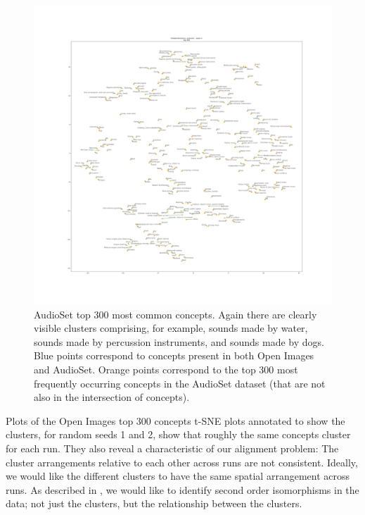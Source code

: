 \begin{figure}[H]
    \centering
    \includegraphics[width=1.0\textwidth]{images/method/probabilistic_independent/top300_tsne_audioset__ProbabilisticGlove_1.png}
    \caption{
        AudioSet top 300 most common concepts. Again there are clearly visible clusters comprising, for example, sounds made by water, sounds made by percussion instruments, and sounds made by dogs. Blue points correspond to concepts present in both Open Images and AudioSet. Orange points correspond to the top 300 most frequently occurring concepts in the AudioSet dataset (that are not also in the intersection of concepts).
    }
\end{figure}

Plots of the Open Images top 300 concepts t-SNE plots annotated to show the clusters, for random seeds 1 and 2, show that roughly the same concepts cluster for each run. They also reveal a characteristic of our alignment problem: The cluster arrangements relative to each other across runs are not consistent. Ideally, we would like the different clusters to have the same spatial arrangement across runs. As described in \cite{SHEPARD19701}, we would like to identify second order isomorphisms in the data; not just the clusters, but the relationship between the clusters. 

